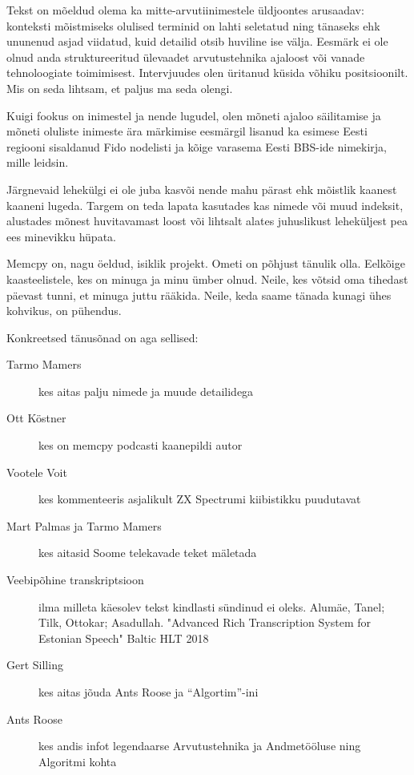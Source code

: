 Tekst on mõeldud olema ka mitte-arvutiinimestele üldjoontes arusaadav: 
konteksti mõistmiseks olulised terminid on lahti seletatud ning tänaseks ehk 
ununenud asjad viidatud, kuid detailid otsib huviline ise välja. Eesmärk ei ole 
olnud anda struktureeritud ülevaadet arvutustehnika ajaloost või vanade 
tehnoloogiate toimimisest. Intervjuudes olen üritanud küsida võhiku 
positsioonilt. Mis on seda lihtsam, et paljus ma seda olengi.

Kuigi fookus on inimestel ja nende lugudel, olen mõneti ajaloo säilitamise ja 
mõneti oluliste inimeste ära märkimise eesmärgil lisanud ka esimese Eesti regiooni
sisaldanud Fido nodelisti ja kõige varasema Eesti BBS-ide nimekirja, mille 
leidsin.

Järgnevaid lehekülgi ei ole juba kasvõi nende mahu pärast ehk mõistlik kaanest 
kaaneni lugeda. Targem on teda lapata kasutades kas nimede või muud indeksit, 
alustades mõnest huvitavamast loost või lihtsalt alates juhuslikust leheküljest 
pea ees minevikku hüpata.

Memcpy on, nagu öeldud, isiklik projekt. Ometi on põhjust tänulik olla. 
Eelkõige kaasteelistele, kes on minuga ja minu ümber olnud. Neile, kes võtsid 
oma tihedast päevast tunni, et minuga juttu rääkida. Neile, keda saame tänada
kunagi ühes kohvikus, on pühendus.

Konkreetsed tänusõnad on aga sellised:

\begin{description}
	\item[Tarmo Mamers] kes aitas palju nimede ja muude detailidega
	\item[Ott Köstner] kes on memcpy podcasti 
kaanepildi autor
	\item[Vootele Voit] kes kommenteeris 
asjalikult ZX Spectrumi kiibistikku puudutavat
	\item[Mart Palmas ja Tarmo Mamers] kes aitasid Soome telekavade teket mäletada 
	\item[Veebipõhine transkriptsioon] ilma milleta käesolev tekst 
kindlasti sündinud ei oleks. Alumäe, Tanel; Tilk, Ottokar; Asadullah. "Advanced 
Rich Transcription System for Estonian Speech" Baltic HLT 2018
	\item[Gert Silling] kes aitas jõuda Ants Roose ja \enquote{Algortim}-ini 
	\item[Ants Roose] kes andis infot legendaarse Arvutustehnika ja Andmetööluse ning Algoritmi kohta 
\end{description}
